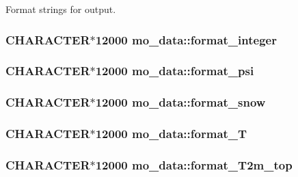 Format strings for output. 

\hypertarget{namespacemo__data_a6e3f24460d266c05576103895a7167be}{
\subsubsection[{format\_\-integer}]{\setlength{\rightskip}{0pt plus 5cm}CHARACTER$\ast$12000 {\bf mo\_\-data::format\_\-integer}}}
\label{namespacemo__data_a6e3f24460d266c05576103895a7167be}
\hypertarget{namespacemo__data_a5a4d1d7b7cad308de5f2a051715e95d5}{
\subsubsection[{format\_\-psi}]{\setlength{\rightskip}{0pt plus 5cm}CHARACTER$\ast$12000 {\bf mo\_\-data::format\_\-psi}}}
\label{namespacemo__data_a5a4d1d7b7cad308de5f2a051715e95d5}
\hypertarget{namespacemo__data_ad94f3b5a63bb78de820fe5a8c6f5574c}{
\subsubsection[{format\_\-snow}]{\setlength{\rightskip}{0pt plus 5cm}CHARACTER$\ast$12000 {\bf mo\_\-data::format\_\-snow}}}
\label{namespacemo__data_ad94f3b5a63bb78de820fe5a8c6f5574c}
\hypertarget{namespacemo__data_abe2cc97e4da609edede5040d2574b93f}{
\subsubsection[{format\_\-T}]{\setlength{\rightskip}{0pt plus 5cm}CHARACTER$\ast$12000 {\bf mo\_\-data::format\_\-T}}}
\label{namespacemo__data_abe2cc97e4da609edede5040d2574b93f}
\hypertarget{namespacemo__data_a15b8dd299b9b9a34d337f74ea3e8b676}{
\subsubsection[{format\_\-T2m\_\-top}]{\setlength{\rightskip}{0pt plus 5cm}CHARACTER$\ast$12000 {\bf mo\_\-data::format\_\-T2m\_\-top}}}

